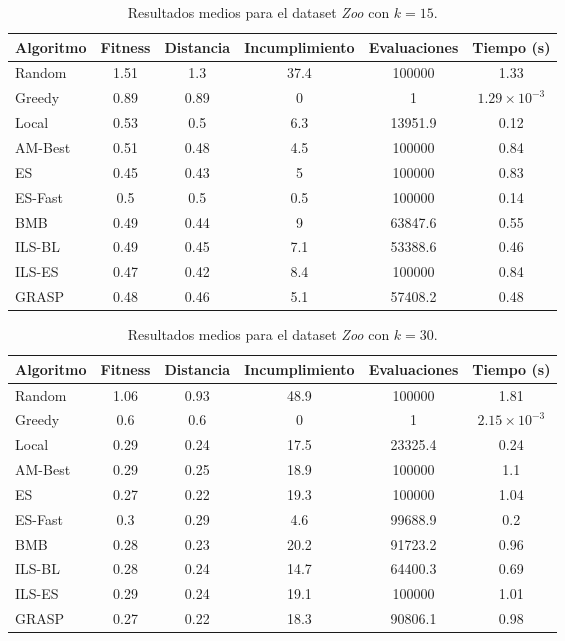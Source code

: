 \documentclass[a4paper,12pt]{article}%
\begin{document}
\begin{table}[H]
	\centering
	\begin{tabular}{|l|ccccc|}
		\hline
		Algoritmo & Fitness & Distancia & Incumplimiento & Evaluaciones & Tiempo (s) \\
		\hline
		Random   & 1.51 & 1.3  & 37.4 & 100000 & 1.33 \\
		Greedy   & 0.89 & 0.89 & 0    & 1      & $1.29\times10^{-3}$ \\
		Local    & 0.53 & 0.5  & 6.3  & 13951.9 & 0.12 \\
		AM-Best  & 0.51 & 0.48 & 4.5  & 100000 & 0.84 \\
		ES       & 0.45 & 0.43 & 5    & 100000 & 0.83 \\
		ES-Fast  & 0.5  & 0.5  & 0.5  & 100000 & 0.14 \\
		BMB      & 0.49 & 0.44 & 9    & 63847.6 & 0.55 \\
		ILS-BL   & 0.49 & 0.45 & 7.1  & 53388.6 & 0.46 \\
		ILS-ES   & 0.47 & 0.42 & 8.4  & 100000 & 0.84 \\
		GRASP    & 0.48 & 0.46 & 5.1  & 57408.2 & 0.48 \\
		\hline
	\end{tabular}
	\caption{Resultados medios para el dataset \textit{Zoo} con $k=15$.}
	\label{tab_zoo15}
\end{table}

\begin{table}[H]
	\centering
	\begin{tabular}{|l|ccccc|}
		\hline
		Algoritmo & Fitness & Distancia & Incumplimiento & Evaluaciones & Tiempo (s) \\
		\hline
		Random   & 1.06 & 0.93 & 48.9 & 100000 & 1.81 \\
		Greedy   & 0.6  & 0.6  & 0    & 1      & $2.15\times10^{-3}$ \\
		Local    & 0.29 & 0.24 & 17.5 & 23325.4 & 0.24 \\
		AM-Best  & 0.29 & 0.25 & 18.9 & 100000 & 1.1 \\
		ES       & 0.27 & 0.22 & 19.3 & 100000 & 1.04 \\
		ES-Fast  & 0.3  & 0.29 & 4.6  & 99688.9 & 0.2 \\
		BMB      & 0.28 & 0.23 & 20.2 & 91723.2 & 0.96 \\
		ILS-BL   & 0.28 & 0.24 & 14.7 & 64400.3 & 0.69 \\
		ILS-ES   & 0.29 & 0.24 & 19.1 & 100000 & 1.01 \\
		GRASP    & 0.27 & 0.22 & 18.3 & 90806.1 & 0.98 \\
		\hline
	\end{tabular}
	\caption{Resultados medios para el dataset \textit{Zoo} con $k=30$.}
	\label{tab_zoo30}
\end{table}
\end{document}
